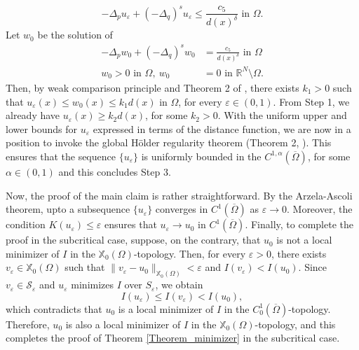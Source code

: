 \documentclass[reqno,oneside]{amsart}
\theoremstyle{definition}
\theoremstyle{remark}
\numberwithin{equation}{section}
\newcommand{\Om} {\Omega}
\newcommand{\p}{\Delta_p}
\newcommand{\qs}{(-\Delta_q)^s}
\newcommand{\bdry}{\mathbb{R}^N \setminus \Omega}
\newcommand{\rar}{\rightarrow}
\newcommand{\omc}{(\overline{\Om})}
\newcommand{\xo}{\mathbb{X}_0}
\begin{document}
\[-\p u_{\varepsilon} + \qs u_{\varepsilon} \leq \frac{c_5}{d(x)^{\delta}} \text{ in } \Om.\]
Let $w_0$ be the solution of
\begin{equation}
    \begin{aligned}
        -\p w_0 + \qs w_0 &= \frac{c_5}{d(x)^{\delta}} \text{ in } \Om\\
        w_0 > 0 \text{ in } \Om,\ w_0 &=0 \text{ in } \bdry.
    \end{aligned}
\end{equation}
Then, by weak comparison principle and Theorem 2 of \cite{dhanya2026regularity}, there exists $k_1 >0$ such that $u_{\varepsilon} (x) \leq w_0 (x) \leq k_1 d(x) $ in $\Om$, for every $\varepsilon \in (0,1)$. From Step 1, we already have $u_\varepsilon(x) \geq k_2 d(x)$, for some $k_2>0$. With the uniform upper and lower bounds for $u_\varepsilon$ expressed in terms of the distance function, we are now in a position to invoke the global H\"older regularity theorem (Theorem 2, \cite{dhanya2026regularity}). This ensures that the sequence $\{u_\varepsilon\}$ is uniformly bounded in the $C^{1,\alpha}(\overline{\Omega})$, for some $\alpha\in (0,1)$ and this concludes Step 3. 

Now, the proof of the main claim is rather straightforward. By the Arzela-Ascoli theorem, upto a subsequence $\{ u_{\varepsilon} \}$ converges in $C^1 \omc$ as $\varepsilon \rar 0$. Moreover, the condition $K(u_{\varepsilon}) \leq \varepsilon$ ensures that $u_{\varepsilon} \rar u_0$ in $C^1 \omc$. Finally, to complete the proof in the subcritical case, suppose, on the contrary, that $u_0$ is not a local minimizer of $I$ in the $\mathbb{X}_0 (\Om)$-topology. Then, for every $\varepsilon>0$, there exists $v_{\varepsilon} \in \xo (\Om)$ such that $\| v_{\varepsilon} - u_0 \|_{\mathbb{X}_0 (\Om)} < \varepsilon$ and $I(v_{\varepsilon}) < I(u_0)$. Since $v_{\varepsilon} \in \mathcal{S}_{\varepsilon}$ and $u_\varepsilon$ minimizes $I$ over $S_\varepsilon$, we obtain
\begin{equation}\label{contradiction1}
    I(u_{\varepsilon}) \leq I(v_{\varepsilon}) < I(u_0),\nonumber
\end{equation}
which contradicts that $u_0$ is a local minimizer of $I$ in the $C^1_0 \omc$-topology. Therefore, $u_0$ is also a local minimizer of $I$ in the $\mathbb{X}_0 (\Om)$-topology, and this completes the proof of Theorem \ref{Theorem_minimizer} in the subcritical case.
\vspace{5pt}
\end{document}
